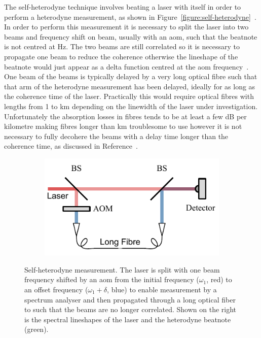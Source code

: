The self-heterodyne technique involves beating a laser with itself in order to perform a heterodyne measurement, as shown in Figure~\ref{figure:self-heterodyne}~\cite{okoshi_novel_1980}.
In order to perform this measurement it is necessary to split the laser into two beams and frequency shift on beam, usually with an \gls{aom}, such that the beatnote is not centred at \unit[0]{Hz}.
The two beams are still correlated so it is necessary to propagate one beam to reduce the coherence otherwise the lineshape of the beatnote would just appear as a delta function centred at the \gls{aom} frequency~\cite{richter_linewidth_1986}.
One beam of the beams is typically delayed by a very long optical fibre such that that arm of the heterodyne measurement has been delayed, ideally for as long as the coherence time of the laser.
Practically this would require optical fibres with lengths from 1 to \unit[100]{km} depending on the linewidth of the laser under investigation.
Unfortunately the absorption losses in fibres tends to be at least a few dB per kilometre making fibres longer than \unit[10]{km} troublesome to use however it is not necessary to fully decohere the beams with a delay time longer than the coherence time, as discussed in Reference~\cite{richter_linewidth_1986}.

\begin{figure}
    \begin{subfigure}{0.49\linewidth}
    \includegraphics{part1/Figs/SelfHeterodyne.pdf}
    \end{subfigure}
    \begin{subfigure}{0.49\linewidth}
    
    \end{subfigure}
    \caption{Self-heterodyne measurement. The laser is split with one beam frequency shifted by an \gls{aom} from the initial frequency ($\omega_1$, red) to an offset frequency ($\omega_1+\delta$, blue) to enable measurement by a spectrum analyser and then propagated through a long optical fiber to such that the beams are no longer correlated. Shown on the right is the spectral lineshapes of the laser and the heterodyne beatnote (green).}
    \label{figure:self_heterodyne}
\end{figure}

